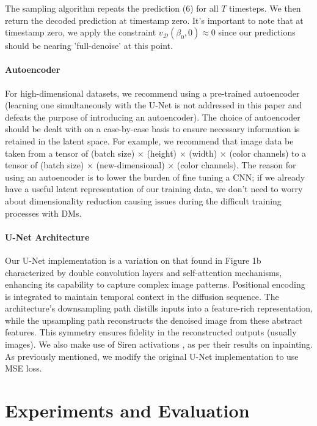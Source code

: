 \documentclass[10pt,twocolumn,letterpaper]{article}
\begin{document}
The sampling algorithm repeats the prediction (6) for all $T$ timesteps. We then return the decoded prediction at timestamp zero. It's important to note that at timestamp zero, we apply the constraint $v_{\mathcal{D}}(\beta_0,0)\approx 0$ since our predictions should be nearing 'full-denoise' at this point.

\paragraph{\textbf{Autoencoder}} For high-dimensional datasets, we recommend using a pre-trained autoencoder (learning one simultaneously with the U-Net is not addressed in this paper and defeats the purpose of introducing an autoencoder). The choice of autoencoder should be dealt with on a case-by-case basis to ensure necessary information is retained in the latent space. For example, we recommend that image data be taken from a tensor of (batch size) $\times$ (height) $\times$ (width) $\times$ (color channels) to a tensor of (batch size) $\times$ (new-dimensional) $\times$ (color channels). The reason for using an autoencoder is to lower the burden of fine tuning a CNN; if we already have a useful latent representation of our training data, we don't need to worry about dimensionality reduction causing issues during the difficult training processes with DMs.

\paragraph{\textbf{U-Net Architecture}} Our U-Net implementation is a variation on that found in Figure 1b characterized by double convolution layers and self-attention mechanisms, enhancing its capability to capture complex image patterns. Positional encoding is integrated to maintain temporal context in the diffusion sequence. The architecture's downsampling path distills inputs into a feature-rich representation, while the upsampling path reconstructs the denoised image from these abstract features. This symmetry ensures fidelity in the reconstructed outputs (usually images). We also make use of Siren activations \cite{DBLP:journals/corr/abs-2006-09661}, as per their results on inpainting. As previously mentioned, we modify the original U-Net implementation to use MSE loss.

\section{Experiments and Evaluation}
\label{sec:intro}
\end{document}

